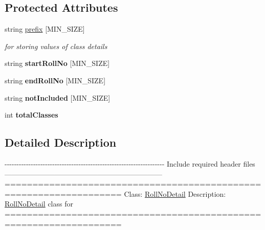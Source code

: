 \subsection*{Protected Attributes}
\begin{DoxyCompactItemize}
\item 
string \hyperlink{classRollNoDetail_af6210eb33a46b384c832560c9f1ebf07}{prefix} \mbox{[}M\-I\-N\-\_\-\-S\-I\-Z\-E\mbox{]}
\begin{DoxyCompactList}\small\item\em for storing values of class details \end{DoxyCompactList}\item 
\hypertarget{classRollNoDetail_ad093a47700148161f6bb299699ed8ff1}{string {\bfseries start\-Roll\-No} \mbox{[}M\-I\-N\-\_\-\-S\-I\-Z\-E\mbox{]}}\label{classRollNoDetail_ad093a47700148161f6bb299699ed8ff1}

\item 
\hypertarget{classRollNoDetail_a4eb0c44518937595bd377d40292422f9}{string {\bfseries end\-Roll\-No} \mbox{[}M\-I\-N\-\_\-\-S\-I\-Z\-E\mbox{]}}\label{classRollNoDetail_a4eb0c44518937595bd377d40292422f9}

\item 
\hypertarget{classRollNoDetail_aad7c0a0f7d5e854737a5fecfb4b745ca}{string {\bfseries not\-Included} \mbox{[}M\-I\-N\-\_\-\-S\-I\-Z\-E\mbox{]}}\label{classRollNoDetail_aad7c0a0f7d5e854737a5fecfb4b745ca}

\item 
\hypertarget{classRollNoDetail_ad904c7f4cf276df50d76651b5c4255c7}{int {\bfseries total\-Classes}}\label{classRollNoDetail_ad904c7f4cf276df50d76651b5c4255c7}

\end{DoxyCompactItemize}


\subsection{Detailed Description}
-\/-\/-\/-\/-\/-\/-\/-\/-\/-\/-\/-\/-\/-\/-\/-\/-\/-\/-\/-\/-\/-\/-\/-\/-\/-\/-\/-\/-\/-\/-\/-\/-\/-\/-\/-\/-\/-\/-\/-\/-\/-\/-\/-\/-\/-\/-\/-\/-\/-\/-\/-\/-\/-\/-\/-\/-\/-\/-\/-\/-\/-\/-\/-\/-\/-\/-\/ Include required header files ------------------------------------------------------------------ =================================================================== Class\-: \hyperlink{classRollNoDetail}{Roll\-No\-Detail} Description\-: \hyperlink{classRollNoDetail}{Roll\-No\-Detail} class for =================================================================== 

